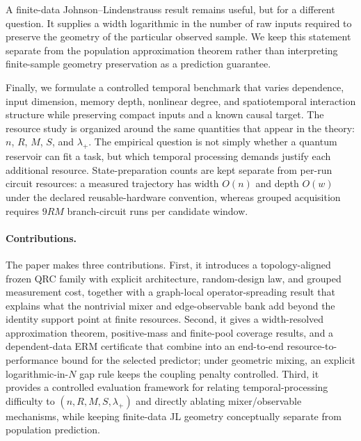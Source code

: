 A finite-data Johnson--Lindenstrauss result remains useful, but for a different
question.  It supplies a width logarithmic in the number of raw inputs required
to preserve the geometry of the particular observed sample.  We keep this
statement separate from the population approximation theorem rather than
interpreting finite-sample geometry preservation as a prediction guarantee.

Finally, we formulate a controlled temporal benchmark that varies dependence,
input dimension, memory depth, nonlinear degree, and spatiotemporal interaction
structure while preserving compact inputs and a known causal target.  The
resource study is organized around the same quantities that appear in the
theory: $n$, $R$, $M$, $S$, and $\lambda_+$.  The empirical question is not
simply whether a quantum reservoir can fit a task, but which temporal processing
demands justify each additional resource.  State-preparation counts are kept
separate from per-run circuit resources: a measured trajectory has width
$O(n)$ and depth $O(w)$ under the declared reusable-hardware convention,
whereas grouped acquisition requires $9RM$ branch-circuit runs per candidate
window.

\paragraph{Contributions.}
The paper makes three contributions.  First, it introduces a topology-aligned
frozen QRC family with explicit architecture, random-design law, and grouped
measurement cost, together with a graph-local operator-spreading result that
explains what the nontrivial mixer and edge-observable bank add beyond the
identity support point at finite resources.  Second, it gives a width-resolved
approximation theorem, positive-mass and finite-pool coverage results, and a
dependent-data ERM certificate that combine into an end-to-end
resource-to-performance bound for the selected predictor; under geometric
mixing, an explicit logarithmic-in-$N$ gap rule keeps the coupling penalty
controlled.  Third, it provides a controlled evaluation framework for
relating temporal-processing difficulty to $(n,R,M,S,\lambda_+)$ and directly
ablating mixer/observable mechanisms, while keeping finite-data JL geometry
conceptually separate from population prediction.
